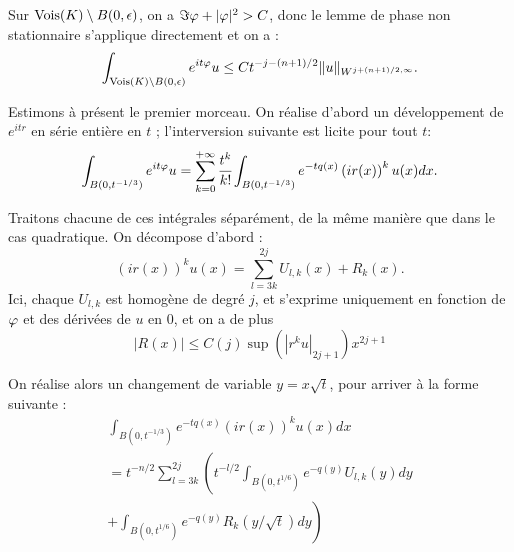\begin{preuve}
Sur $\operatorname{Vois}(K)\setminus B(0,\epsilon)$, on a $\Im \varphi + |\varphi|^2 > C$, donc le lemme de phase non stationnaire s'applique directement et on a :
\begin{equation*}
  \int_{\operatorname{Vois}(K)\setminus B(0,\epsilon)}e^{it\varphi}u \leq Ct^{-j-(n+1)/2}\|u\|_{W^{j+(n+1)/2,\infty}}.
\end{equation*}

Estimons à présent le premier morceau. On réalise d'abord un développement de $e^{itr}$ en série entière en $t$ ; l'interversion suivante est licite pour tout $t$:
\begin{equation*}
  \int_{B(0,t^{-1/3})}e^{it\varphi}u = \sum_{k=0}^{+\infty}\cfrac{t^k}{k!}\int_{B(0,t^{-1/3})}e^{-tq(x)}\left(ir(x)\right)^ku(x)dx.
\end{equation*}

Traitons chacune de ces intégrales séparément, de la même manière que dans le cas quadratique. On décompose d'abord :
\begin{equation*}
  \left(ir(x)\right)^ku(x) = \sum_{l=3k}^{2j}U_{l,k}(x) + R_k(x).
\end{equation*}
\noindent Ici, chaque $U_{l,k}$ est homogène de degré $j$, et s'exprime uniquement en fonction de $\varphi$ et des dérivées de $u$ en $0$, et on a de plus
\begin{equation*}
  |R(x)| \leq C(j) \sup (|r^ku|_{2j+1}) x^{2j+1}
\end{equation*}

On réalise alors un changement de variable $y=x\sqrt{t}$, pour arriver à la forme suivante :
\begin{multline*}
  \int_{B(0,t^{-1/3})}e^{-tq(x)}\left(ir(x)\right)^ku(x)dx \\= t^{-n/2}\sum_{l=3k}^{2j}\left(t^{-l/2}\int_{B(0,t^{1/6})}e^{-q(y)}U_{l,k}(y)dy\right. \\+ \left.\int_{B(0,t^{1/6})}e^{-q(y)}R_k(y/\sqrt{t})dy\right)
\end{multline*}


\end{preuve}
